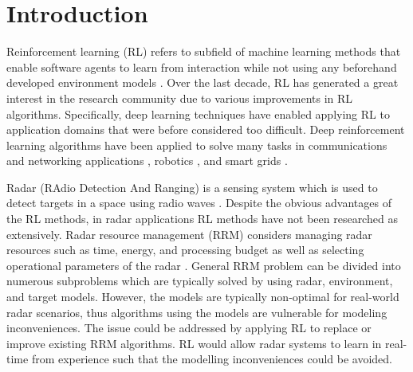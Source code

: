 \documentclass[english, 12pt, a4paper, elec, utf8, a-1b, online]{aaltothesis}
\begin{document}
\cleardoublepage

\section{Introduction}


Reinforcement learning (RL) refers to subfield of machine learning methods that enable software agents to learn from interaction while not using any beforehand developed environment models \cite{Sutton2018}. 
Over the last decade, RL has generated a great interest in the research community due to various improvements in RL algorithms. 
Specifically, deep learning techniques have enabled applying RL to application domains that were before considered too difficult. 
Deep reinforcement learning algorithms have been applied to solve many tasks in communications and networking applications \cite{Luong2018}, robotics \cite{Kober2013}, and smart grids \cite{Zhang2018}. 


Radar (RAdio Detection And Ranging) is a sensing system which is used to detect targets in a space using radio waves \cite{Curry2011}.
Despite the obvious advantages of the RL methods, in radar applications RL methods have not been researched as extensively.
Radar resource management (RRM) considers managing radar resources such as time, energy, and processing budget as well as selecting operational parameters of the radar \cite{Moo2016}. 
General RRM problem can be divided into numerous subproblems which are typically solved by using radar, environment, and target models. 
However, the models are typically non-optimal for real-world radar scenarios, thus algorithms using the models are vulnerable for modeling inconveniences.  
The issue could be addressed by applying RL to replace or improve existing RRM algorithms. 
RL would allow radar systems to learn in real-time from experience such that the modelling inconveniences could be avoided. 
\end{document}
